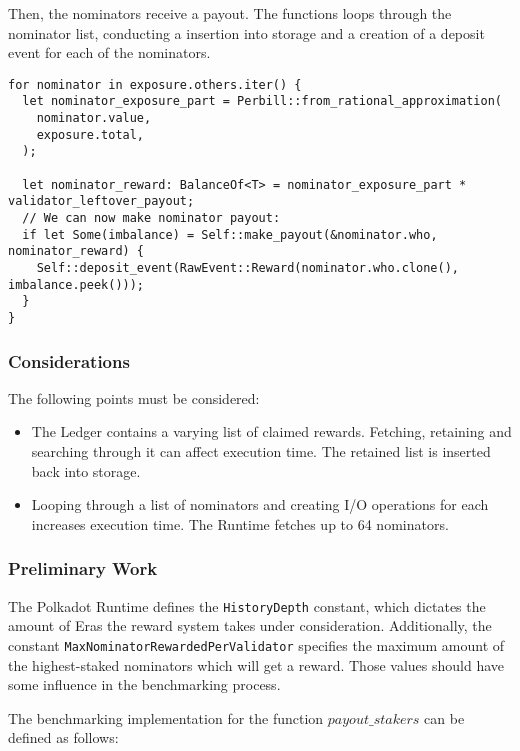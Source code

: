 \documentclass[11pt,a4paper]{article}
\begin{document}
Then, the nominators receive a payout. The functions loops through the nominator
list, conducting a insertion into storage and a creation of a deposit event for
each of the nominators.

\begin{verbatim}
for nominator in exposure.others.iter() {
  let nominator_exposure_part = Perbill::from_rational_approximation(
    nominator.value,
    exposure.total,
  );

  let nominator_reward: BalanceOf<T> = nominator_exposure_part * validator_leftover_payout;
  // We can now make nominator payout:
  if let Some(imbalance) = Self::make_payout(&nominator.who, nominator_reward) {
    Self::deposit_event(RawEvent::Reward(nominator.who.clone(), imbalance.peek()));
  }
}
\end{verbatim}

\subsubsection{Considerations}

The following points must be considered:

\begin{itemize}
  \item The Ledger contains a varying list of claimed rewards. Fetching,
  retaining and searching through it can affect execution time. The retained
  list is inserted back into storage.
  \item Looping through a list of nominators and creating I/O operations for
  each increases execution time. The Runtime fetches up to 64 nominators.
\end{itemize}

\subsubsection{Preliminary Work}

The Polkadot Runtime defines the \verb|HistoryDepth| constant, which dictates
the amount of Eras the reward system takes under consideration. Additionally,
the constant \verb|MaxNominatorRewardedPerValidator| specifies the maximum
amount of the highest-staked nominators which will get a reward. Those values
should have some influence in the benchmarking process.
\newline

The benchmarking implementation for the function $payout\_stakers$ can be
defined as follows:
\newline
\end{document}
